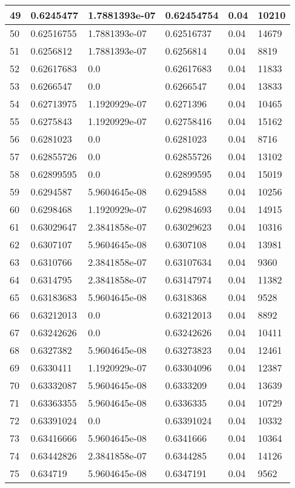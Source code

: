 \begin{longtable}{|l|l|l|l|l|l|}
49 & 0.6245477 & 1.7881393e-07 & 0.62454754 & 0.04 & 10210 \\ \hline 
50 & 0.62516755 & 1.7881393e-07 & 0.62516737 & 0.04 & 14679 \\ \hline 
51 & 0.6256812 & 1.7881393e-07 & 0.6256814 & 0.04 & 8819 \\ \hline 
52 & 0.62617683 & 0.0 & 0.62617683 & 0.04 & 11833 \\ \hline 
53 & 0.6266547 & 0.0 & 0.6266547 & 0.04 & 13833 \\ \hline 
54 & 0.62713975 & 1.1920929e-07 & 0.6271396 & 0.04 & 10465 \\ \hline 
55 & 0.6275843 & 1.1920929e-07 & 0.62758416 & 0.04 & 15162 \\ \hline 
56 & 0.6281023 & 0.0 & 0.6281023 & 0.04 & 8716 \\ \hline 
57 & 0.62855726 & 0.0 & 0.62855726 & 0.04 & 13102 \\ \hline 
58 & 0.62899595 & 0.0 & 0.62899595 & 0.04 & 15019 \\ \hline 
59 & 0.6294587 & 5.9604645e-08 & 0.6294588 & 0.04 & 10256 \\ \hline 
60 & 0.6298468 & 1.1920929e-07 & 0.62984693 & 0.04 & 14915 \\ \hline 
61 & 0.63029647 & 2.3841858e-07 & 0.63029623 & 0.04 & 10316 \\ \hline 
62 & 0.6307107 & 5.9604645e-08 & 0.6307108 & 0.04 & 13981 \\ \hline 
63 & 0.6310766 & 2.3841858e-07 & 0.63107634 & 0.04 & 9360 \\ \hline 
64 & 0.6314795 & 2.3841858e-07 & 0.63147974 & 0.04 & 11382 \\ \hline 
65 & 0.63183683 & 5.9604645e-08 & 0.6318368 & 0.04 & 9528 \\ \hline 
66 & 0.63212013 & 0.0 & 0.63212013 & 0.04 & 8892 \\ \hline 
67 & 0.63242626 & 0.0 & 0.63242626 & 0.04 & 10411 \\ \hline 
68 & 0.6327382 & 5.9604645e-08 & 0.63273823 & 0.04 & 12461 \\ \hline 
69 & 0.6330411 & 1.1920929e-07 & 0.63304096 & 0.04 & 12387 \\ \hline 
70 & 0.63332087 & 5.9604645e-08 & 0.6333209 & 0.04 & 13639 \\ \hline 
71 & 0.63363355 & 5.9604645e-08 & 0.6336335 & 0.04 & 10729 \\ \hline 
72 & 0.63391024 & 0.0 & 0.63391024 & 0.04 & 10332 \\ \hline 
73 & 0.63416666 & 5.9604645e-08 & 0.6341666 & 0.04 & 10364 \\ \hline 
74 & 0.63442826 & 2.3841858e-07 & 0.6344285 & 0.04 & 14126 \\ \hline 
75 & 0.634719 & 5.9604645e-08 & 0.6347191 & 0.04 & 9562 \\ \hline 
\end{longtable}